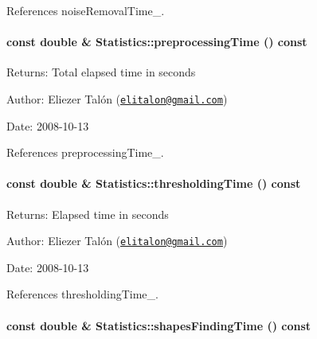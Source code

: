 References noiseRemovalTime\_\-.\hypertarget{class_statistics_9b1c2d1f1338069346c80293a2c11b6d}{
\paragraph[preprocessingTime]{\setlength{\rightskip}{0pt plus 5cm}const double \& Statistics::preprocessingTime () const}\hfill}
\label{class_statistics_9b1c2d1f1338069346c80293a2c11b6d}


\begin{Desc}
\item[Returns:]Total elapsed time in seconds\end{Desc}
\begin{Desc}
\item[Author:]Eliezer Talón (\href{mailto:elitalon@gmail.com}{\tt elitalon@gmail.com}) \end{Desc}
\begin{Desc}
\item[Date:]2008-10-13 \end{Desc}


References preprocessingTime\_\-.\hypertarget{class_statistics_51a8c70011a201873db8f388dad733ac}{
\paragraph[thresholdingTime]{\setlength{\rightskip}{0pt plus 5cm}const double \& Statistics::thresholdingTime () const}\hfill}
\label{class_statistics_51a8c70011a201873db8f388dad733ac}


\begin{Desc}
\item[Returns:]Elapsed time in seconds\end{Desc}
\begin{Desc}
\item[Author:]Eliezer Talón (\href{mailto:elitalon@gmail.com}{\tt elitalon@gmail.com}) \end{Desc}
\begin{Desc}
\item[Date:]2008-10-13 \end{Desc}


References thresholdingTime\_\-.\hypertarget{class_statistics_9437fbc6726c6179b3ee4c130520e642}{
\paragraph[shapesFindingTime]{\setlength{\rightskip}{0pt plus 5cm}const double \& Statistics::shapesFindingTime () const}\hfill}
\label{class_statistics_9437fbc6726c6179b3ee4c130520e642}


